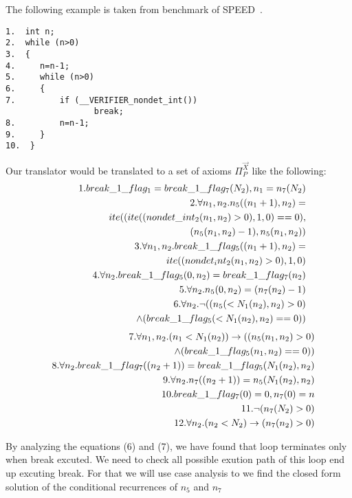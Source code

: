 The following example is taken from benchmark of SPEED~\cite{speed1}.
\begin{verbatim}
1.  int n;
2.  while (n>0)
3.  {
4.     n=n-1;
5.     while (n>0) 
6.     {
7.         if (__VERIFIER_nondet_int())
                  break;
8.         n=n-1;
9.     }
10.  }
\end{verbatim}

Our translator would be translated to a set of axioms $\Pi_P^{\vec{X}}$ like the following:
\begin{eqnarray*}
	&&1.break\_1\_flag_1 = break\_1\_flag_7(N_2), n_1 = n_7(N_2)\\
	&&2.\forall n_1,n_2.n_5((n_1+1),n_2) = \\ &&\hspace*{5em}ite((ite((nondet\_int_2(n_1,n_2)>0),1,0)==0),\\ 
    &&\hspace*{7em}(n_5(n_1,n_2)-1),n_5(n_1,n_2))\\ 
	&&3.\forall n_1,n_2.break\_1\_flag_5((n_1+1),n_2) = \\ &&\hspace*{5em}ite((nondet_int_2(n_1,n_2)>0),1,0)\\ 
	&&4.\forall n_2.break\_1\_flag_5(0,n_2) = break\_1\_flag_7(n_2)\\
	&&5.\forall n_2.n_5(0,n_2) = (n_7(n_2)-1)\\
	&&6.\forall n_2.\neg ((n_5(<N_1(n_2),n_2)>0)\\
	&&\hspace*{5em}\land (break\_1\_flag_5(<N_1(n_2),n_2)==0))\\
\end{eqnarray*}
\begin{eqnarray*}
	&&7.\forall n_1,n_2.(n_1<N_1(n_2)) \rightarrow ((n_5(n_1,n_2)>0)\\
	&& \hspace*{5em}\land (break\_1\_flag_5(n_1,n_2)==0))\\
	&&8.\forall n_2.break\_1\_flag_7((n_2+1)) = break\_1\_flag_5(N_1(n_2),n_2)\\
	&&9.\forall n_2.n_7((n_2+1)) = n_5(N_1(n_2),n_2)\\
	&&10.break\_1\_flag_7(0) = 0, n_7(0) = n\\
	&&11.\neg (n_7(N_2)>0)\\
	&&12.\forall n_2.(n_2<N_2) \rightarrow (n_7(n_2)>0)
\end{eqnarray*}


By analyzing the equations (6) and (7), we have found that loop terminates only when break excuted. We need to check all possible exution path of this loop end up excuting break. For that we will use case analysis to we find the closed form solution of the conditional recurrences of $n_5$ and $n_7$

